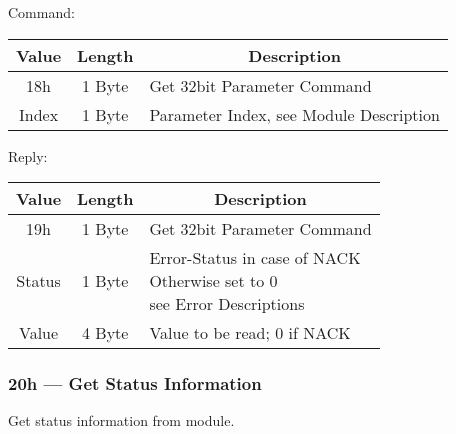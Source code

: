 Command:
\begin{table}[H]
    \centering
    \begin{tabular}{|c|c|l|}
        \hline
        \textbf{Value}   &   \textbf{Length} & \multicolumn{1}{|c|}{\textbf{Description}}\\ \hline \hline
        18h   &  1 Byte & Get 32bit Parameter Command \\ \hline
        Index & 1 Byte  & Parameter Index, see Module Description \\ \hline
    \end{tabular}
\label{tab:CAN-19-C}
\end{table}
Reply:
\begin{table}[H]
    \centering
    \begin{tabular}{|c|c|l|}
        \hline
        \textbf{Value}   &   \textbf{Length} & \multicolumn{1}{|c|}{\textbf{Description}}\\ \hline \hline
        19h   &  1 Byte & Get 32bit Parameter Command \\ \hline
        Status & 1 Byte & \makecell[l]{Error-Status in case of NACK \\ Otherwise set to 0\\see Error Descriptions}\\ \hline
        Value & 4 Byte & Value to be read; 0 if NACK \\ \hline
    \end{tabular}
\label{tab:CAN-19-R}
\end{table}

\subsubsection{20h --- Get Status Information}
Get status information from module.

